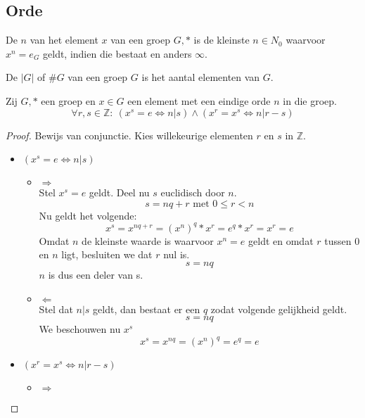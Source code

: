 \documentclass[main.tex]{subfiles}
\begin{document}
\subsection{Orde}
\label{sec:orde}

\begin{de}
  De  $n$ van het element $x$ van een groep $G,*$ is de kleinste $n \in N_{0}$ waarvoor $x^{n} = e_{G}$ geldt, indien die bestaat en anders $\infty$.
\end{de}

\begin{de}
  De  $|G|$ of $\#G$ van een groep $G$ is het aantal elementen van $G$.
\end{de}

\begin{ei}
  \label{ei:groep-eindige-orde-deelbaarheid}
  Zij $G,*$ een groep en $x \in G$ een element met een eindige orde $n$ in die groep.
  \[ \forall r,s \in \mathbb{Z}:\ (x^{s} = e \Leftrightarrow n | s) \wedge (x^{r} = x^{s} \Leftrightarrow n | r-s)\]
  \begin{proof}
    Bewijs van conjunctie.
    Kies willekeurige elementen $r$ en $s$ in $\mathbb{Z}$.
    \begin{itemize}
    \item $(x^{s} = e \Leftrightarrow n | s)$
      \begin{itemize}
      \item $\Rightarrow$\\
        Stel $x^{s} = e$ geldt.
        Deel nu $s$ euclidisch door $n$.
        \[ s = nq + r \text{ met } 0 \le r < n \]
        Nu geldt het volgende:
        \[ x^{s} = x^{nq + r} = (x^{n})^{q} * x^{r} = e^{q} * x^{r} = x^{r} = e\]
        Omdat $n$ de kleinste waarde is waarvoor $x^{n}=e$ geldt en omdat $r$ tussen $0$ en $n$ ligt, besluiten we dat $r$ nul is.
        \[ s = nq \]
        $n$ is dus een deler van s.
      \item $\Leftarrow$\\
        Stel dat $n | s$ geldt, dan bestaat er een $q$ zodat volgende gelijkheid geldt.
        \[ s = nq \]
        We beschouwen nu $x^{s}$
        \[ x^{s} = x^{nq} = (x^{n})^{q} = e^{q} = e\]
      \end{itemize}
    \item $(x^{r} = x^{s} \Leftrightarrow n | r-s)$
      \begin{itemize}
      \item $\Rightarrow$\\

\end{itemize}
\end{itemize}
\end{proof}
\end{ei}
\end{document}
